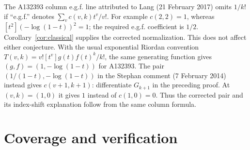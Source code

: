 \documentclass[11pt]{article}
\begin{document}
The A132393 column e.g.f. line attributed to Lang (21 February 2017)
omits $1/k!$ if ``e.g.f.'' denotes $\sum_v c(v,k)t^v/v!$.
For example $c(2,2)=1$, whereas $[t^2](-\log(1-t))^2=1$;
the required e.g.f. coefficient is $1/2$. Corollary~\ref{cor:classical}
supplies the corrected normalization. This does not affect either conjecture.
With the usual exponential Riordan convention
$T(v,k)=v![t^v]g(t)f(t)^k/k!$, the same generating function gives
$(g,f)=(1,-\log(1-t))$ for A132393.
The pair $(1/(1-t),-\log(1-t))$ in the Stephan comment (7 February 2014)
instead gives $c(v+1,k+1)$: differentiate $G_{k+1}$ in the preceding proof.
At $(v,k)=(1,0)$ it gives $1$ instead of $c(1,0)=0$.
Thus the corrected pair and its index-shift explanation follow from the
same column formula.

\section{Coverage and verification}
\small
\end{document}
